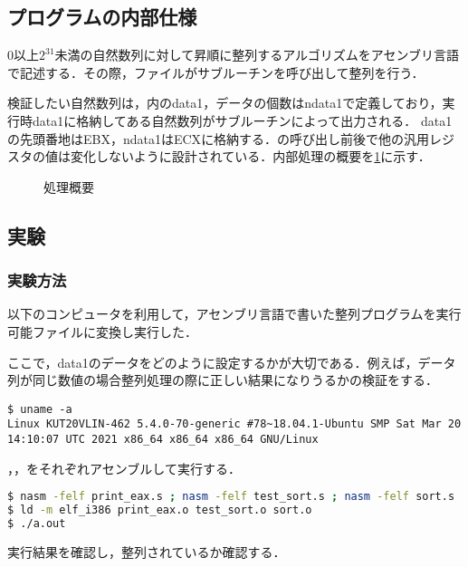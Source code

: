 \subsection{プログラムの内部仕様}
\(0\)以上\(2^{31}\)未満の自然数列に対して昇順に整列するアルゴリズムをアセンブリ言語で記述する．その際，\testsort ファイルが\sort サブルーチンを呼び出して整列を行う．\par
検証したい自然数列は，\testsort 内の{\ttfamily data1}，データの個数は{\ttfamily ndata1}で定義しており，\testsort 実行時{\ttfamily data1}に格納してある自然数列が\print サブルーチンによって出力される．
{\ttfamily data1}の先頭番地は{\ttfamily EBX}，{\ttfamily ndata1}は{\ttfamily ECX}に格納する．\sort の呼び出し前後で他の汎用レジスタの値は変化しないように設計されている．内部処理の概要を\ref{kadai1:abs}に示す．
\begin{figure}[h]
    \centering
    \caption{処理概要}
    \label{kadai1:abs}
\end{figure}
\subsection{実験}
\subsubsection{実験方法}
以下のコンピュータを利用して，アセンブリ言語で書いた整列プログラムを実行可能ファイルに変換し実行した．\par
ここで，{\ttfamily data1}のデータをどのように設定するかが大切である．例えば，データ列が同じ数値の場合整列処理の際に正しい結果になりうるかの検証をする．
\begin{lstlisting}[frame={single},numbers={none},breakindent={0pt},language={}]
$ uname -a
Linux KUT20VLIN-462 5.4.0-70-generic #78~18.04.1-Ubuntu SMP Sat Mar 20 14:10:07 UTC 2021 x86_64 x86_64 x86_64 GNU/Linux
\end{lstlisting}
，\testsort，をそれぞれアセンブルして実行する．
\begin{lstlisting}[frame={single},numbers={none},breakindent={0pt},language={Bash}]
$ nasm -felf print_eax.s ; nasm -felf test_sort.s ; nasm -felf sort.s
$ ld -m elf_i386 print_eax.o test_sort.o sort.o
$ ./a.out
\end{lstlisting}
実行結果を確認し，整列されているか確認する．
